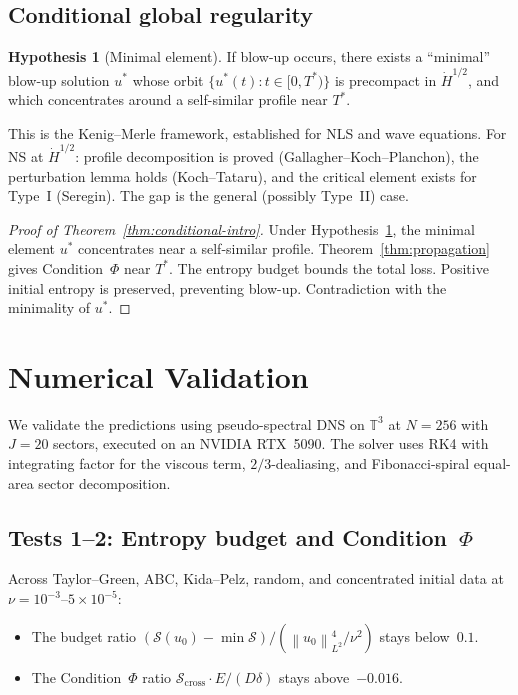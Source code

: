 \documentclass[11pt]{article}
\theoremstyle{definition}
\newtheorem{hypothesis}[theorem]{Hypothesis}
\newcommand{\T}{\mathbb{T}}
\newcommand{\norm}[1]{\left\| #1 \right\|}
\newcommand{\Hdot}[1]{\dot{H}^{#1}}
\newcommand{\cS}{\mathcal{S}}
\begin{document}
\subsection{Conditional global regularity}

\begin{hypothesis}[Minimal element]
\label{hyp:minimal}
If blow-up occurs, there exists a ``minimal'' blow-up
solution $u^*$ whose orbit
$\{u^*(t) : t \in [0,T^*)\}$ is precompact in
$\Hdot{1/2}$, and which concentrates around a
self-similar profile near $T^*$.
\end{hypothesis}

This is the Kenig--Merle framework, established for NLS and
wave equations.  For NS at $\Hdot{1/2}$:
profile decomposition is proved
(Gallagher--Koch--Planchon), the perturbation lemma
holds (Koch--Tataru), and the critical element exists
for Type~I (Seregin).  The gap is the general (possibly
Type~II) case.

\begin{proof}[Proof of Theorem~\ref{thm:conditional-intro}]
Under Hypothesis~\ref{hyp:minimal}, the minimal element
$u^*$ concentrates near a self-similar profile.
Theorem~\ref{thm:propagation} gives Condition~$\Phi$
near $T^*$.  The entropy budget bounds the total loss.
Positive initial entropy is preserved, preventing blow-up.
Contradiction with the minimality of $u^*$.
\end{proof}


\section{Numerical Validation}\label{sec:numerics}

We validate the predictions using pseudo-spectral DNS on
$\T^3$ at $N = 256$ with $J = 20$ sectors,
executed on an NVIDIA RTX~5090.  The solver uses
RK4 with integrating factor for the viscous term,
$2/3$-dealiasing, and Fibonacci-spiral equal-area sector
decomposition.


\subsection{Tests 1--2: Entropy budget and Condition~$\Phi$}

Across Taylor--Green, ABC, Kida--Pelz, random, and
concentrated initial data at
$\nu = 10^{-3}$--$5\times10^{-5}$:
\begin{itemize}[leftmargin=2em]
\item The budget ratio
$(\cS(u_0)-\min\cS)/(\norm{u_0}_{L^2}^4/\nu^2)$
stays below~$0.1$.
\item The Condition~$\Phi$ ratio
$\cS_{\mathrm{cross}}\cdot E/(D\delta)$ stays
above~$-0.016$.
\end{itemize}
\end{document}
